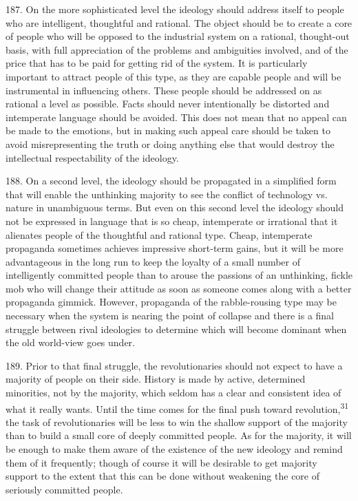 \documentclass{article}
\begin{document}
187. On the more sophisticated level the ideology should address itself to people who are 
intelligent, thoughtful and rational. The object should be to create a core of people who will be 
opposed to the industrial system on a rational, thought-out basis, with full appreciation of the 
problems and ambiguities involved, and of the price that has to be paid for getting rid of the 
system. It is particularly important to attract people of this type, as they are capable people and 
will be instrumental in influencing others. These people should be addressed on as rational a level 
as possible. Facts should never intentionally be distorted and intemperate language should be 
avoided. This does not mean that no appeal can be made to the emotions, but in making such 
appeal care should be taken to avoid misrepresenting the truth or doing anything else that would 
destroy the intellectual respectability of the ideology. \vspace{\baselineskip}

188. On a second level, the ideology should be propagated in a simplified form that will enable 
the unthinking majority to see the conflict of technology vs. nature in unambiguous terms. But 
even on this second level the ideology should not be expressed in language that is so cheap, 
intemperate or irrational that it alienates people of the thoughtful and rational type. Cheap, 
intemperate propaganda sometimes achieves impressive short-term gains, but it will be more 
advantageous in the long run to keep the loyalty of a small number of intelligently committed 
people than to arouse the passions of an unthinking, fickle mob who will change their attitude as 
soon as someone comes along with a better propaganda gimmick. However, propaganda of the 
rabble-rousing type may be necessary when the system is nearing the point of collapse and there 
is a final struggle between rival ideologies to determine which will become dominant when the old 
world-view goes under. \vspace{\baselineskip}

189. Prior to that final struggle, the revolutionaries should not expect to have a majority of people 
on their side. History is made by active, determined minorities, not by the majority, which seldom 
has a clear and consistent idea of what it really wants. Until the time comes for the final push 
toward revolution,\textsuperscript{31} the task of revolutionaries will be less to win the shallow support of the 
majority than to build a small core of deeply committed people. As for the majority, it will be 
enough to make them aware of the existence of the new ideology and remind them of it frequently; 
though of course it will be desirable to get majority support to the extent that this can be done 
without weakening the core of seriously committed people. \vspace{\baselineskip} \newpage
\end{document}
